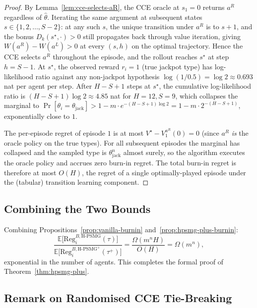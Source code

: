\documentclass{article}
\begin{document}
\begin{proof}
By Lemma~\ref{lem:cce-selects-aR}, the CCE oracle at $s_1 = 0$ returns $a^R$ regardless of $\hat\theta$. Iterating the same argument at subsequent states $s \in \{1, 2, \ldots, S-2\}$: at any such $s$, the unique transition under $a^R$ is to $s+1$, and the bonus $D_k(s^\star, \cdot) > 0$ still propagates back through value iteration, giving $W(a^R) - W(a^L) > 0$ at every $(s, h)$ on the optimal trajectory. Hence the CCE selects $a^R$ throughout the episode, and the rollout reaches $s^\star$ at step $h = S - 1$. At $s^\star$, the observed reward $r_i = 1$ (true jackpot type) has log-likelihood ratio against any non-jackpot hypothesis $\log(1 / 0.5) = \log 2 \approx 0.693$ nat per agent per step. After $H - S + 1$ steps at $s^\star$, the cumulative log-likelihood ratio is $(H - S + 1) \log 2 \approx 4.85$ nat for $H = 12, S = 9$, which collapses the marginal to $\Pr[\theta_i = \theta_{\mathrm{jack}}] > 1 - m \cdot e^{-(H-S+1)\log 2} = 1 - m \cdot 2^{-(H-S+1)}$, exponentially close to $1$.

The per-episode regret of episode $1$ is at most $V^\star - V^{a^R}_1(0) = 0$ (since $a^R$ \emph{is} the oracle policy on the true types). For all subsequent episodes the marginal has collapsed and the sampled type is $\theta_{\mathrm{jack}}^n$ almost surely, so the algorithm executes the oracle policy and accrues zero burn-in regret. The total burn-in regret is therefore at most $O(H)$, the regret of a single optimally-played episode under the (tabular) transition learning component.
\end{proof}

\subsection{Combining the Two Bounds}
\label{app:hpsmg-plus-combine}

Combining Propositions~\ref{prop:vanilla-burnin} and~\ref{prop:hpsmg-plus-burnin}:
\begin{equation}
\frac{\mathbb{E}\big[\mathrm{Reg}_i^{B, \text{H-PSMG}}(\tau)\big]}{\mathbb{E}\big[\mathrm{Reg}_i^{B, \text{H-PSMG}^+}(\tau^+)\big]} = \frac{\Omega(m^n H)}{O(H)} = \Omega(m^n),
\end{equation}
exponential in the number of agents. This completes the formal proof of Theorem~\ref{thm:hpsmg-plus}.

\subsection{Remark on Randomised CCE Tie-Breaking}
\end{document}
